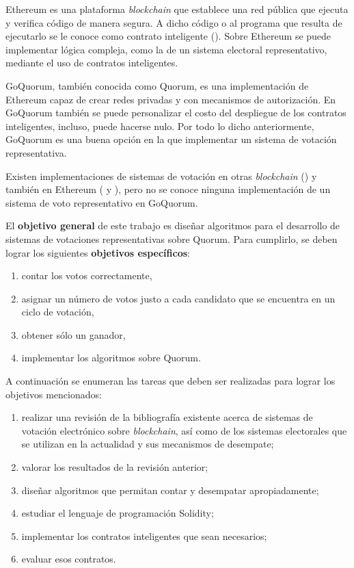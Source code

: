 Ethereum es una plataforma \textit{blockchain} que establece una red p\'ublica que ejecuta y verifica c\'odigo de manera segura.   A dicho c\'odigo o al programa que resulta de ejecutarlo se le conoce como contrato inteligente (\cite{eth-aws}). Sobre Ethereum se puede implementar l\'ogica compleja, como  la de un sistema electoral representativo, mediante el uso de contratos inteligentes.  

GoQuorum, tambi\'en conocida como Quorum, es una implementaci\'on de Ethereum capaz de crear redes privadas y con mecanismos de autorizaci\'on. En GoQuorum tambi\'en se puede personalizar el costo del despliegue de los contratos inteligentes, incluso, puede hacerse nulo. Por todo lo dicho anteriormente, GoQuorum es una buena opci\'on en la que implementar un sistema de votaci\'on representativa.


Existen implementaciones de sistemas de votaci\'on en otras \textit{blockchain} (\cite{agora}) y tambi\'en en Ethereum (\cite{ovn} y \cite{borda_count}), pero no se conoce ninguna implementaci\'on de un sistema de voto representativo en GoQuorum.

El \textbf{objetivo general} de este trabajo es dise\~nar algoritmos para el desarrollo de sistemas de votaciones representativas sobre Quorum. Para cumplirlo, se deben lograr los siguientes \textbf{objetivos espec\'ificos}:
\begin{enumerate}
    \item contar los votos correctamente, \label{item:objectives:count}
    \item asignar un n\'umero de votos justo a cada candidato que se encuentra en un ciclo de votaci\'on, \label{item:objectives:cycle}
    \item obtener s\'olo un ganador, \label{item:objectives:winner}
    \item implementar los algoritmos sobre Quorum.
\end{enumerate}


A continuaci\'on se enumeran las tareas que deben ser realizadas para lograr los objetivos mencionados:
\begin{enumerate}
    \item realizar una revisi\'on de la bibliograf\'ia existente acerca de sistemas de votaci\'on electr\'onico sobre \textit{blockchain}, as\'i como de los sistemas electorales que se utilizan en la actualidad y sus mecanismos de desempate;
    \item valorar los resultados de la revisi\'on anterior;
    \item dise\~nar algoritmos que permitan contar y desempatar apropiadamente;
    \item estudiar el lenguaje de programaci\'on Solidity;
    \item implementar los contratos inteligentes que sean necesarios;
    \item evaluar esos contratos.
\end{enumerate}

